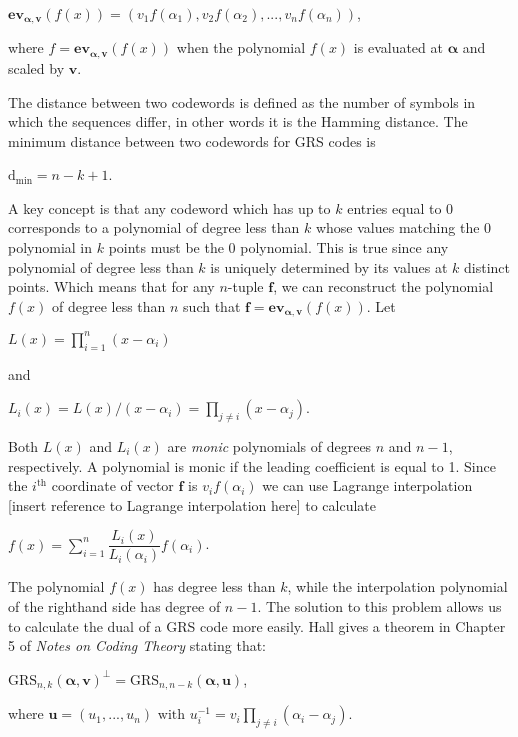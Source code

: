 \documentclass{article}
\begin{document}
\begin{center}
$\textbf{ev}_{\boldsymbol\alpha,\textbf{v}}(f(x)) = (v_{1}f(\alpha_{1}),v_{2}f(\alpha_{2}),...,v_{n}f(\alpha_{n}))$,
\end{center}
where $f = \textbf{ev}_{\boldsymbol\alpha,\textbf{v}}(f(x))$ when the polynomial $f(x)$ is evaluated at $\boldsymbol\alpha$ and scaled by $\textbf{v}$.

The distance between two codewords is defined as the number of symbols in which the sequences differ, in other words it is the Hamming distance. The minimum distance between two codewords for GRS codes is

\begin{center}
$\text{d}_{\text{min}} = n - k + 1$.
\end{center}

A key concept is that any codeword which has up to $k$ entries equal to 0 corresponds to a polynomial of degree less than $k$ whose values matching the 0 polynomial in $k$ points must be the 0 polynomial. This is true since any polynomial of degree less than $k$ is uniquely determined by its values at $k$ distinct points. Which means that for any $n$-tuple $\textbf{f}$, we can reconstruct the polynomial $f(x)$ of degree less than $n$ such that $\textbf{f} = \textbf{ev}_{\boldsymbol\alpha,\textbf{v}}(f(x))$. Let

\begin{center}
$L(x) = \prod\limits_{i=1}^{n} (x - \alpha_{i})$
\end{center}
and
\begin{center}
$L_{i}(x) = L(x)/(x - \alpha_{i}) = \prod\limits_{j \neq i} (x - \alpha_{j})$.
\end{center}
Both $L(x)$ and $L_{i}(x)$ are \textit{monic} polynomials of degrees $n$ and $n - 1$, respectively. A polynomial is monic if the leading coefficient is equal to 1. Since the $i^{\text{th}}$ coordinate of vector $\textbf{f}$ is $v_{i}f(\alpha_{i})$ we can use Lagrange interpolation [insert reference to Lagrange interpolation here] to calculate
\begin{center}
$f(x) = \sum\limits_{i=1}^{n} \dfrac{L_{i}(x)}{L_{i}(\alpha_{i})}f(\alpha_{i})$.
\end{center}

The polynomial $f(x)$ has degree less than $k$, while the interpolation polynomial of the righthand side has degree of $n - 1$. The solution to this problem allows us to calculate the dual of a GRS code more easily. Hall gives a theorem in Chapter 5 of \textit{Notes on Coding Theory} stating that:
\begin{center}
$\text{GRS}_{n,k}(\boldsymbol\alpha, \textbf{v})^{\perp} = \text{GRS}_{n,n - k}(\boldsymbol\alpha, \textbf{u})$,
\end{center}
where $\textbf{u} = (u_{1},...,u_{n}) \text{ with } u_{i}^{-1} = v_{i}\prod\limits_{j \neq i} (\alpha_{i} - \alpha_{j})$.
\end{document}
